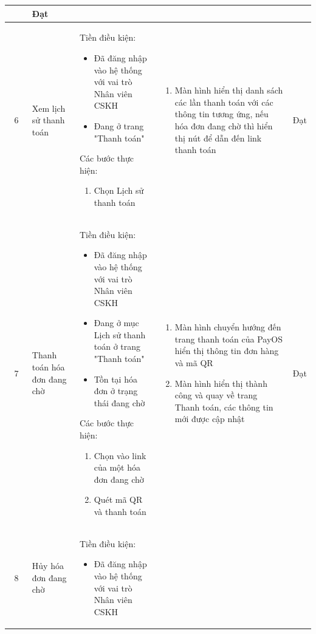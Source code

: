 \begin{longtable}{|c|m{2.5cm}|m{5.5cm}|m{4.5cm}|c|}
\begin{enumerate}[label=\arabic*.]
    \end{enumerate} & Đạt \\
    \hline
    6 & 
    Xem lịch sử thanh toán& 
    Tiền điều kiện:
    \begin{itemize}
        \item Đã đăng nhập vào hệ thống với vai trò Nhân viên CSKH
        \item Đang ở trang "Thanh toán"
    \end{itemize}
    Các bước thực hiện: 
    \begin{enumerate}[label=\arabic*.]
        \item Chọn Lịch sử thanh toán
    \end{enumerate}
    & 
    \begin{enumerate}[label=\arabic*.]
        \item Màn hình hiển thị danh sách các lần thanh toán với các thông tin tương ứng, nếu hóa đơn đang chờ thì hiển thị nút để dẫn đến link thanh toán
    \end{enumerate} & Đạt \\
    \hline
    7 & 
    Thanh toán hóa đơn đang chờ& 
    Tiền điều kiện:
    \begin{itemize}
        \item Đã đăng nhập vào hệ thống với vai trò Nhân viên CSKH
        \item Đang ở mục Lịch sử thanh toán ở trang "Thanh toán"
        \item Tồn tại hóa đơn ở trạng thái đang chờ
    \end{itemize}
    Các bước thực hiện: 
    \begin{enumerate}[label=\arabic*.]
        \item Chọn vào link của một hóa đơn đang chờ
        \item Quét mã QR và thanh toán
    \end{enumerate}
    & 
    \begin{enumerate}[label=\arabic*.]
        \item Màn hình chuyển hướng đến trang thanh toán của PayOS hiển thị thông tin đơn hàng và mã QR
        \item Màn hình hiển thị thành công và quay về trang Thanh toán, các thông tin mới được cập nhật
    \end{enumerate} & Đạt \\
    \hline
    8 & 
    Hủy hóa đơn đang chờ& 
    Tiền điều kiện:
    \begin{itemize}
        \item Đã đăng nhập vào hệ thống với vai trò Nhân viên CSKH

\end{itemize}
\end{longtable}
